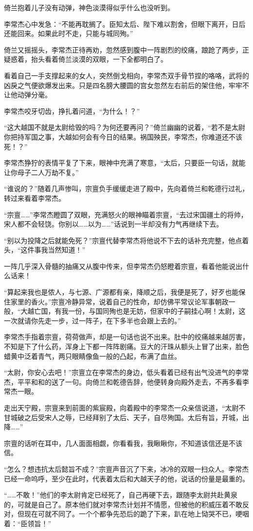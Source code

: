 倚兰抱着儿子没有动弹，神色淡漠得似乎什么也没听到。

李常杰心中发急：“不能再耽搁了。臣知太后、陛下难以割舍，但眼下离开，日后还能回来。如果此时不走，只能与城同殉。”

倚兰又摇摇头，李常杰正待再劝，忽然感到腹中一阵剧烈的绞痛，踉跄了两步，正疑惑着，抬头看着倚兰淡漠的双眼，一下全都明白了。

看着自己一手支撑起来的女人，突然倒戈相向，李常杰双手骨节捏的咯咯，武将的凶戾之气便欲爆发出来。只是四名膀大腰圆的宫女忽然左右前后的架住他，牢牢不让他动弹分毫。

李常杰咬牙切齿，挣扎着问道，“为什么！？”

“这大越国不就是太尉给毁的吗？为何还要再问？”倚兰幽幽的说着，“若不是太尉你把持军国之事，大越如何会有今日的结果。祸国殃民，李常杰，你难道还不该死！？”

李常杰狰狞的表情平复了下来，眼神中充满了寒意，“太后，只要臣一句话，就能让你母子二人万劫不复。”

“谁说的？”随着几声惨叫，宗亶负手缓缓走进了殿中，先向着倚兰和乾德行过礼，转过来看着李常杰。

“宗亶……”李常杰瞪圆了双眼，充满怒火的眼神瞄着宗亶，“去过宋国疆土的将帅，宋人都不会轻饶。你别以……以为……”话说到一半却没有力气再继续下去。

“别以为投降之后就能免死？”宗亶代替李常杰将他说不下去的话补充完整，他点着头，“这件事我当然知道！”

一阵几乎深入骨髓的抽痛又从腹中传来，但李常杰仍怒瞪着宗亶，看着他能说出什么话来！

“算起来我也是侬人，与七源、广源都有亲，降顺之后，我便是死了，好歹也能保住家里的香火。”宗亶冷静异常，说着自己的性命，却仿佛平常议论军事朝政一般，“大越亡国，有我一份，与国同殉也是无妨，但家中的子嗣挂心啊！太尉，这一次就请你先走一步，过一阵子，在下多半也会跟上去的。”

李常杰手指着宗亶，荷荷做声，却是一句话也说不出来。肚中的绞痛越来越厉害，不知是下了什么药，浑身上下都一阵阵剧痛。豆大的汗珠从额头上冒了出来，脸色蜡黄中泛着青气，两只眼睛像鱼一般的凸起，布满了血丝。

“太尉，你安心去吧！”宗亶立在李常杰的身边，低头看着已经有出气没进气的李常杰，平平和和的送了一句。向倚兰和乾德告辞，他便转身向殿外走去，不再多看李常杰一眼。

走出天宁殿，宗亶来到前面的紫宸殿，向着殿中的李常杰一众亲信说道，“太尉不甘城破之后受宋人之辱，已经拜别了太后、天子，自尽殉国。太后有旨，开城，出降……”

宗亶的话听在耳中，几人面面相觑，你看看我，我瞅瞅你，不知道该信还是不该信。

“怎么？想违抗太后懿旨不成？”宗亶声音沉了下来，冰冷的双眼一扫众人。李常杰已经一命呜呼，至少在此时，代表着太后和大越天子的他，说话的份量是最重的。

“……不敢！”他们的李太尉肯定已经死了，自己再硬下去，跟随李太尉共赴黄泉的，可就是自己了。原本他们就对李常杰计划并不情愿，但被他的积威压着不敢反对，但现在可就不同了。一个个都争先恐后的跪了下来，趴在地上恸哭不已，哽咽着：“臣领旨！”

